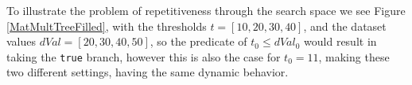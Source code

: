 To illustrate the problem of repetitiveness through the search space we see Figure \ref{MatMultTreeFilled}, with the thresholds $t = [10, 20, 30, 40]$, and the dataset values $dVal = [20, 30, 40, 50]$, so the predicate of $t_0 \leq dVal_0$ would result in taking the \texttt{true} branch, however this is also the case for $t_0 = 11$, making these two different settings, having the same dynamic behavior.